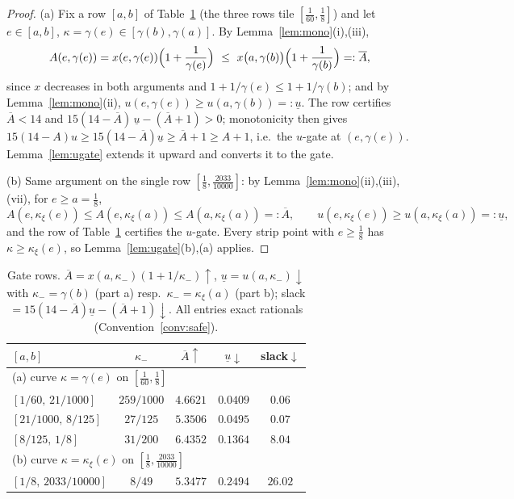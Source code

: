 \documentclass[11pt]{article}
\theoremstyle{remark}
\newcommand{\kxi}{\kappa_\xi}
\begin{document}
\begin{proof}
(a) Fix a row $[a,b]$ of Table~\ref{tab:gate} (the three rows tile
$[\tfrac1{60},\tfrac18]$) and let $e\in[a,b]$, $\kappa=\gamma(e)\in
[\gamma(b),\gamma(a)]$.  By Lemma~\ref{lem:mono}(i),(iii),
\[
        A(e,\gamma(e))=x(e,\gamma(e))\Bigl(1+\frac1{\gamma(e)}\Bigr)
        \ \le\ x\bigl(a,\gamma(b)\bigr)\Bigl(1+\frac1{\gamma(b)}\Bigr)
        =:\overline A,
\]
since $x$ decreases in both arguments and $1+1/\gamma(e)\le1+1/\gamma(b)$;
and by Lemma~\ref{lem:mono}(ii),
$u(e,\gamma(e))\ge u(a,\gamma(b))=:\underline u$.
The row certifies $\overline A<14$ and
$15(14-\overline A)\,\underline u-(\overline A+1)>0$; monotonicity then
gives $15(14-A)u\ge15(14-\overline A)\underline u\ge\overline A+1\ge A+1$,
i.e.\ the $u$-gate at $(e,\gamma(e))$.  Lemma~\ref{lem:ugate} extends it
upward and converts it to the gate.

(b) Same argument on the single row $[\tfrac18,\tfrac{2033}{10000}]$: by
Lemma~\ref{lem:mono}(ii),(iii),(vii), for $e\ge a=\tfrac18$,
\[
        A(e,\kxi(e))\le A(e,\kxi(a))\le A(a,\kxi(a))=:\overline A,
        \qquad
        u(e,\kxi(e))\ge u(a,\kxi(a))=:\underline u ,
\]
and the row of Table~\ref{tab:gate} certifies the $u$-gate.  Every strip
point with $e\ge\tfrac18$ has $\kappa\ge\kxi(e)$, so
Lemma~\ref{lem:ugate}(b),(a) applies.
\end{proof}

\begin{table}[h]\centering
\caption{Gate rows.  $\overline A{=}x(a,\kappa_-)(1{+}1/\kappa_-)\uparrow$,
$\underline u{=}u(a,\kappa_-)\downarrow$ with $\kappa_-=\gamma(b)$ (part a)
resp.\ $\kappa_-=\kxi(a)$ (part b); slack
$=15(14-\overline A)\underline u-(\overline A+1)\downarrow$.  All entries
exact rationals (Convention~\ref{conv:safe}).}\label{tab:gate}
\begin{tabular}{lcccc}
\toprule
$[a,b]$ & $\kappa_-$ & $\overline A\uparrow$ & $\underline u\downarrow$ & slack$\downarrow$\\
\midrule
\multicolumn{5}{l}{(a) curve $\kappa=\gamma(e)$ on $[\tfrac1{60},\tfrac18]$}\\
$[1/60,\,21/1000]$ & $259/1000$ & $4.6621$ & $0.0409$ & $0.06$ \\
$[21/1000,\,8/125]$ & $27/125$ & $5.3506$ & $0.0495$ & $0.07$ \\
$[8/125,\,1/8]$ & $31/200$ & $6.4352$ & $0.1364$ & $8.04$ \\
\midrule
\multicolumn{5}{l}{(b) curve $\kappa=\kxi(e)$ on $[\tfrac18,\tfrac{2033}{10000}]$}\\
$[1/8,\,2033/10000]$ & $8/49$ & $5.3477$ & $0.2494$ & $26.02$ \\
\bottomrule
\end{tabular}
\end{table}
\end{document}
